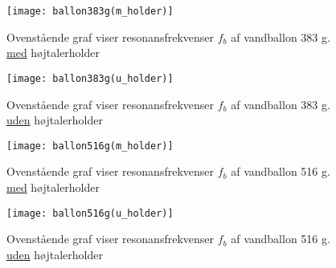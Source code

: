 \begin{figure}[htbp]
  \begin{minipage}[b]{1\linewidth}
    \centering
    \texttt{[image: ballon383g(m\_holder)]}
    \caption{Ovenstående graf viser resonansfrekvenser $f_{b}$  af vandballon 383 g. \underline{med} højtalerholder}
    \label{fig:ballon216g(m_holder)}
    \label{fig:ballon383g(m_holder)}
  \end{minipage}
  \hspace{1cm}
  \begin{minipage}[b]{1\linewidth}
    \centering
    \texttt{[image: ballon383g(u\_holder)]}
    \caption{Ovenstående graf viser resonansfrekvenser $f_{b}$  af vandballon 383 g. \underline{uden} højtalerholder}
    \label{fig:ballon383g(u_holder)}
  \end{minipage}
\end{figure}

\begin{figure}[htbp]
  \begin{minipage}[b]{1\linewidth}
    \centering
    \texttt{[image: ballon516g(m\_holder)]}
    \caption{Ovenstående graf viser resonansfrekvenser $f_{b}$  af vandballon 516 g. \underline{med} højtalerholder}
    \label{fig:ballon516g(m_holder)}
  \end{minipage}
  \hspace{1cm}
  \begin{minipage}[b]{1\linewidth}
    \centering
    \texttt{[image: ballon516g(u\_holder)]}
    \caption{Ovenstående graf viser resonansfrekvenser $f_{b}$  af vandballon 516 g. \underline{uden} højtalerholder}
    \label{fig:ballon516g(u_holder)}
  \end{minipage}
\end{figure}


